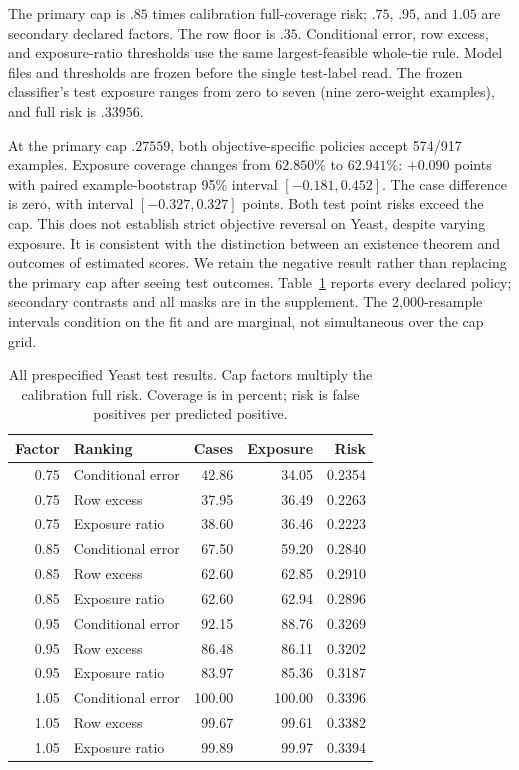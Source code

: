 The primary cap is $.85$ times calibration full-coverage risk; $.75$, $.95$, and $1.05$ are secondary declared factors. The row floor is $.35$. Conditional error, row excess, and exposure-ratio thresholds use the same largest-feasible whole-tie rule. Model files and thresholds are frozen before the single test-label read. The frozen classifier's test exposure ranges from zero to seven (nine zero-weight examples), and full risk is $.33956$.

At the primary cap $.27559$, both objective-specific policies accept 574/917 examples. Exposure coverage changes from $62.850\%$ to $62.941\%$: $+0.090$ points with paired example-bootstrap 95\% interval $[-0.181,0.452]$. The case difference is zero, with interval $[-0.327,0.327]$ points. Both test point risks exceed the cap. This does not establish strict objective reversal on Yeast, despite varying exposure. It is consistent with the distinction between an existence theorem and outcomes of estimated scores. We retain the negative result rather than replacing the primary cap after seeing test outcomes. Table~\ref{tab:new-yeast} reports every declared policy; secondary contrasts and all masks are in the supplement. The 2,000-resample intervals condition on the fit and are marginal, not simultaneous over the cap grid.

\begin{table}[t]\centering\small
\caption{All prespecified Yeast test results. Cap factors multiply the calibration full risk. Coverage is in percent; risk is false positives per predicted positive.}\label{tab:new-yeast}
\begin{tabular}{rlrrr}\toprule
Factor & Ranking & Cases & Exposure & Risk\\\midrule
0.75 & Conditional error & 42.86 & 34.05 & 0.2354\\
0.75 & Row excess & 37.95 & 36.49 & 0.2263\\
0.75 & Exposure ratio & 38.60 & 36.46 & 0.2223\\
0.85 & Conditional error & 67.50 & 59.20 & 0.2840\\
0.85 & Row excess & 62.60 & 62.85 & 0.2910\\
0.85 & Exposure ratio & 62.60 & 62.94 & 0.2896\\
0.95 & Conditional error & 92.15 & 88.76 & 0.3269\\
0.95 & Row excess & 86.48 & 86.11 & 0.3202\\
0.95 & Exposure ratio & 83.97 & 85.36 & 0.3187\\
1.05 & Conditional error & 100.00 & 100.00 & 0.3396\\
1.05 & Row excess & 99.67 & 99.61 & 0.3382\\
1.05 & Exposure ratio & 99.89 & 99.97 & 0.3394\\
\bottomrule\end{tabular}\end{table}
